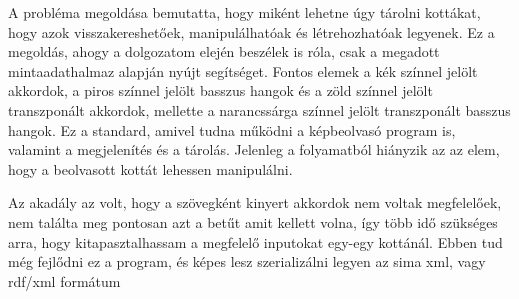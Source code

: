 
A probléma megoldása bemutatta, hogy miként lehetne úgy tárolni kottákat, hogy azok visszakereshetőek, manipulálhatóak és létrehozhatóak legyenek. Ez a megoldás, ahogy a dolgozatom elején beszélek is róla, csak a megadott mintaadathalmaz alapján nyújt segítséget. Fontos elemek a kék színnel jelölt akkordok, a piros színnel jelölt basszus hangok és a zöld színnel jelölt transzponált akkordok, mellette a narancssárga színnel jelölt transzponált basszus hangok. Ez a standard, amivel tudna működni a képbeolvasó program is, valamint a megjelenítés és a tárolás. Jelenleg a folyamatból hiányzik az az elem, hogy a beolvasott kottát lehessen manipulálni.
\par
Az akadály az volt, hogy a szövegként kinyert akkordok nem voltak megfelelőek, nem találta meg pontosan azt a betűt amit kellett volna, így több idő szükséges arra, hogy kitapasztalhassam a megfelelő inputokat egy-egy kottánál. Ebben tud még fejlődni ez a program, és képes lesz szerializálni legyen az sima xml, vagy rdf/xml formátum
